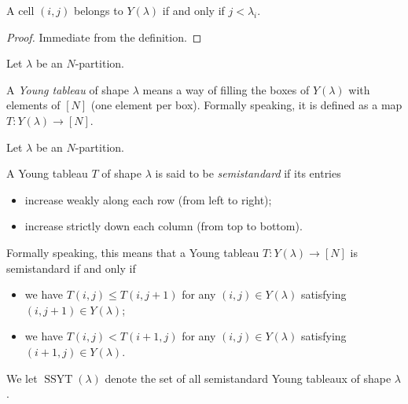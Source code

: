 \begin{lemma}
\label{lem.sf.ydiag-mem}
\leanhelper
\leanok
A cell $(i,j)$ belongs to $Y(\lambda)$ if and only if $j < \lambda_i$.
\end{lemma}

\begin{proof}
\leanok
Immediate from the definition.
\end{proof}

\begin{definition}
\label{def.sf.ytab}
\leantarget
\leanok
Let $\lambda$ be an $N$-partition.

A \emph{Young tableau} of shape $\lambda$ means a way of filling the boxes of
$Y\left(  \lambda\right)  $ with elements of $\left[  N\right]  $ (one element
per box). Formally speaking, it is defined as a map $T:Y\left(  \lambda
\right)  \rightarrow\left[  N\right]  $.
\end{definition}

\begin{definition}
\label{def.sf.ssyt}
\leantarget
\leanok
Let $\lambda$ be an $N$-partition.

A Young tableau $T$ of shape $\lambda$ is said to be \emph{semistandard} if
its entries

\begin{itemize}
\item increase weakly along each row (from left to right);

\item increase strictly down each column (from top to bottom).
\end{itemize}

Formally speaking, this means that a Young tableau $T:Y\left(  \lambda\right)
\rightarrow\left[  N\right]  $ is semistandard if and only if

\begin{itemize}
\item we have $T\left(  i,j\right)  \leq T\left(  i,j+1\right)  $ for any
$\left(  i,j\right)  \in Y\left(  \lambda\right)  $ satisfying $\left(
i,j+1\right)  \in Y\left(  \lambda\right)  $;

\item we have $T\left(  i,j\right)  <T\left(  i+1,j\right)  $ for any $\left(
i,j\right)  \in Y\left(  \lambda\right)  $ satisfying $\left(  i+1,j\right)
\in Y\left(  \lambda\right)  $.
\end{itemize}

We let $\operatorname*{SSYT}\left(  \lambda\right)  $ denote the set of all
semistandard Young tableaux of shape $\lambda$.
\end{definition}

